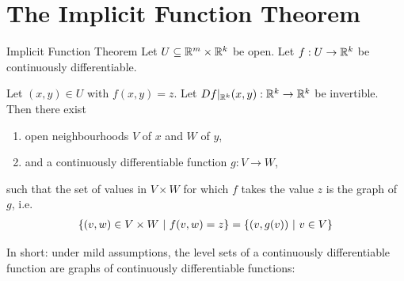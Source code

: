 \section{The Implicit Function Theorem}
\begin{importanttheorem}{Implicit Function Theorem}{}
	Let $U \subseteq \mathbb{R}^m \times \mathbb{R}^k$ be open. Let $f : U \to \mathbb{R}^k$ be continuously differentiable.
	
	Let $(x,y) \in U$ with $f(x,y) = z$. Let $Df|_{\mathbb{R}^k}(x,y) : \mathbb{R}^k \to \mathbb{R}^k$ be invertible. Then there exist
	\begin{enumerate}
		\item open neighbourhoods $V$ of $x$ and $W$ of $y$,
		\item and a continuously differentiable function $g : V \to W$,
	\end{enumerate}
	such that the set of values in $V \times W$ for which $f$ takes the value $z$ is the graph of $g$, i.e.
	\begin{align*}
		\qty{(v,w) \in V \times W ~\middle|~f(v,w) = z}
		=
		\qty{(v,g(v)) ~\middle|~v \in V}
	\end{align*}
\end{importanttheorem}
In short: under mild assumptions, the level sets of a continuously differentiable function are graphs of continuously differentiable functions:
